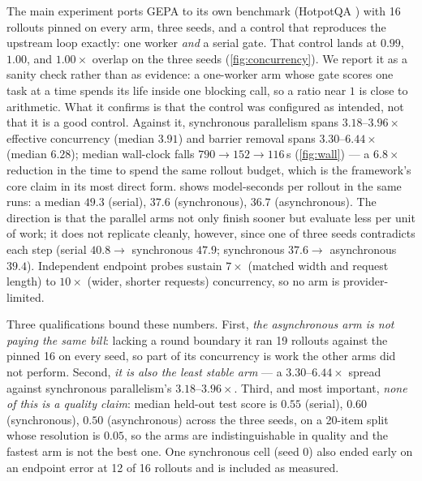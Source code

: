 \documentclass{article}
\begin{document}
The main experiment ports GEPA to its own benchmark (HotpotQA \citep{agrawal2025gepa,yang2018hotpotqa}) with 16 rollouts pinned on every arm, three seeds, and a control that reproduces the upstream loop exactly: one worker \emph{and} a serial gate. That control lands at $0.99$, $1.00$, and $1.00\times$ overlap on the three seeds (\cref{fig:concurrency}). We report it as a sanity check rather than as evidence: a one-worker arm whose gate scores one task at a time spends its life inside one blocking call, so a ratio near $1$ is close to arithmetic. What it confirms is that the control was configured as intended, not that it is a good control. Against it, synchronous parallelism spans $3.18$--$3.96\times$ effective concurrency (median $3.91$) and barrier removal spans $3.30$--$6.44\times$ (median $6.28$); median wall-clock falls $790 \to 152 \to 116$\,s (\cref{fig:wall}) --- a $6.8\times$ reduction in the time to spend the same rollout budget, which is the framework's core claim in its most direct form.  shows model-seconds per rollout in the same runs: a median $49.3$ (serial), $37.6$ (synchronous), $36.7$ (asynchronous). The direction is that the parallel arms not only finish sooner but evaluate less per unit of work; it does not replicate cleanly, however, since one of three seeds contradicts each step (serial $40.8 \to$ synchronous $47.9$; synchronous $37.6 \to$ asynchronous $39.4$). Independent endpoint probes sustain $7\times$ (matched width and request length) to $10\times$ (wider, shorter requests) concurrency, so no arm is provider-limited.

Three qualifications bound these numbers. First, \emph{the asynchronous arm is not paying the same bill}: lacking a round boundary it ran 19 rollouts against the pinned 16 on every seed, so part of its concurrency is work the other arms did not perform. Second, \emph{it is also the least stable arm} --- a $3.30$--$6.44\times$ spread against synchronous parallelism's $3.18$--$3.96\times$. Third, and most important, \emph{none of this is a quality claim}: median held-out test score is $0.55$ (serial), $0.60$ (synchronous), $0.50$ (asynchronous) across the three seeds, on a 20-item split whose resolution is $0.05$, so the arms are indistinguishable in quality and the fastest arm is not the best one. One synchronous cell (seed 0) also ended early on an endpoint error at 12 of 16 rollouts and is included as measured.
\end{document}

